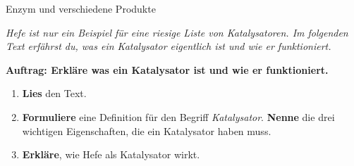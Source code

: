 \documentclass{scrartcl}  %
\begin{document}
				\begin{minipage}[t]{0.2\textwidth}
					{\selectfont  %
						\begin{tcolorbox}[enhanced,
							colback=white,
							colframe=teal,
							fonttitle=\sffamily\bfseries\large, 
							attach boxed title to top left={xshift=3.2mm,yshift=-0.50mm},
							boxed title style={skin=enhancedfirst jigsaw,size=small,arc=1mm,bottom=-1mm,colframe=teal,height=0.6cm},
							colbacktitle=teal,
							drop lifted shadow]
							
							Enzym und verschiedene Produkte
						\end{tcolorbox}
					}  %
				\end{minipage}
		\newpage  %
				\noindent \textit{Hefe ist nur ein Beispiel für eine riesige Liste von Katalysatoren. Im folgenden Text erfährst du, was ein Katalysator eigentlich ist und wie er funktioniert.} \newline
				
				\noindent \textbf{Auftrag: Erkläre was ein Katalysator ist und wie er funktioniert.}
				\begin{enumerate}
					\item \textbf{Lies} den Text.
					\item \textbf{Formuliere} eine Definition für den Begriff \textit{Katalysator}. \textbf{Nenne} die drei wichtigen Eigenschaften, die ein Katalysator haben muss.
					\item \textbf{Erkläre}, wie Hefe als Katalysator wirkt.
				\end{enumerate}
				
\end{document}
